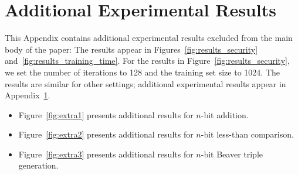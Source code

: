 \documentclass[acmlarge, manuscript, screen, review, anonymous, table]{acmart}
\begin{document}
\section{Additional Experimental Results}
\label{sec:addit-exper-results}

This Appendix contains additional experimental results excluded from the main body of the paper:
The results appear in Figures~\ref{fig:results_security} and~\ref{fig:results_training_time}. For the results in Figure~\ref{fig:results_security}, we set the number of iterations to 128 and the training set size to 1024. The results are similar for other settings; additional experimental results appear in Appendix~\ref{sec:addit-exper-results}.
%
\begin{itemize}
\item Figure~\ref{fig:extra1} presents additional results for $n$-bit addition.
\item Figure~\ref{fig:extra2} presents additional results for $n$-bit less-than comparison.
\item Figure~\ref{fig:extra3} presents additional results for $n$-bit Beaver triple generation.
\end{itemize}
\end{document}
